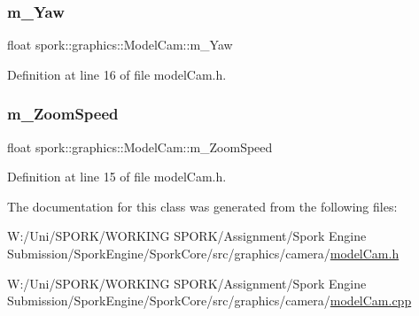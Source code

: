 \subsubsection{\texorpdfstring{m\+\_\+\+Yaw}{m\_Yaw}}
{\footnotesize\ttfamily float spork\+::graphics\+::\+Model\+Cam\+::m\+\_\+\+Yaw\hspace{0.3cm}{\ttfamily [private]}}



Definition at line 16 of file model\+Cam.\+h.

\mbox{\label{classspork_1_1graphics_1_1_model_cam_ae8efa38634c73e83df6469c3707206ab}} 
\subsubsection{\texorpdfstring{m\+\_\+\+Zoom\+Speed}{m\_ZoomSpeed}}
{\footnotesize\ttfamily float spork\+::graphics\+::\+Model\+Cam\+::m\+\_\+\+Zoom\+Speed\hspace{0.3cm}{\ttfamily [private]}}



Definition at line 15 of file model\+Cam.\+h.



The documentation for this class was generated from the following files\+:\begin{DoxyCompactItemize}
\item 
W\+:/\+Uni/\+S\+P\+O\+R\+K/\+W\+O\+R\+K\+I\+N\+G S\+P\+O\+R\+K/\+Assignment/\+Spork Engine Submission/\+Spork\+Engine/\+Spork\+Core/src/graphics/camera/\hyperlink{model_cam_8h}{model\+Cam.\+h}\item 
W\+:/\+Uni/\+S\+P\+O\+R\+K/\+W\+O\+R\+K\+I\+N\+G S\+P\+O\+R\+K/\+Assignment/\+Spork Engine Submission/\+Spork\+Engine/\+Spork\+Core/src/graphics/camera/\hyperlink{model_cam_8cpp}{model\+Cam.\+cpp}\end{DoxyCompactItemize}
